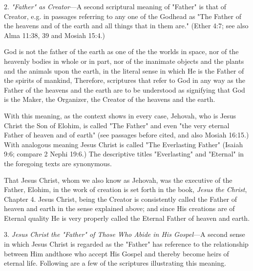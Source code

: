 2. \textit{"Father" as Creator}—A second scriptural meaning of "Father" is that of Creator, e.g. in
passages referring to any one of the Godhead as "The Father of the heavens and of the earth
and all things that in them are." (Ether 4:7; see also Alma 11:38, 39 and Mosiah 15:4.)

God is not the father of the earth as one of the the worlds in space, nor of the heavenly bodies
in whole or in part, nor of the inanimate objects and the plants and the animals upon the
earth, in the literal sense in which He is the Father of the spirits of mankind, Therefore,
scriptures that refer to God in any way as the Father of the heavens and the earth are to be
understood as signifying that God is the Maker, the Organizer, the Creator of the heavens and
the earth.

With this meaning, as the context shows in every case, Jehovah, who is Jesus Christ the Son
of Elohim, is called "The Father" and even "the very eternal Father of heaven and of earth"
(see passages before cited, and also Mosiah 16:15.) With analogous meaning Jesus Christ is
called "The Everlasting Father" (Isaiah 9:6; compare 2 Nephi 19:6.) The descriptive titles
"Everlasting" and "Eternal" in the foregoing texts are synonymous.

That Jesus Christ, whom we also know as Jehovah, was the executive of the Father, Elohim,
in the work of creation is set forth in the book, \textit{Jesus the Christ}, Chapter 4. Jesus Christ,
being the Creator is consistently called the Father of heaven and earth in the sense explained
above; and since His creations are of Eternal quality He is very properly called the Eternal
Father of heaven and earth.

3. \textit{Jesus Christ the "Father" of Those Who Abide in His Gospel}—A second sense in which
Jesus Christ is regarded as the "Father" has reference to the relationship between Him andthose who accept His Gospel and thereby become heirs of eternal life. Following are a few of
the scriptures illustrating this meaning.

